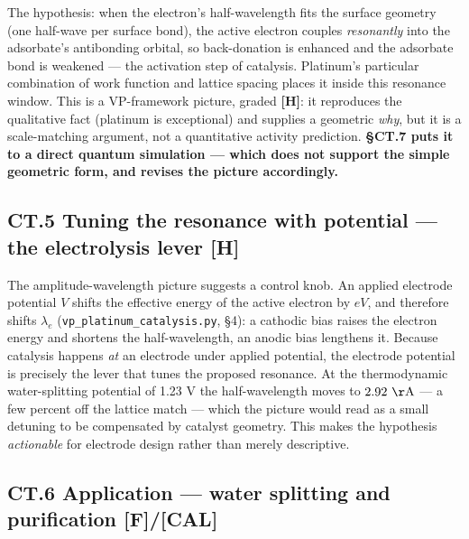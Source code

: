 \documentclass[
  10pt,
]{article}
\begin{document}
The hypothesis: when the electron's half-wavelength fits the surface
geometry (one half-wave per surface bond), the active electron couples
\emph{resonantly} into the adsorbate's antibonding orbital, so
back-donation is enhanced and the adsorbate bond is weakened --- the
activation step of catalysis. Platinum's particular combination of work
function and lattice spacing places it inside this resonance window.
This is a VP-framework picture, graded \textbf{{[}H{]}}: it reproduces
the qualitative fact (platinum is exceptional) and supplies a geometric
\emph{why}, but it is a scale-matching argument, not a quantitative
activity prediction. \textbf{§CT.7 puts it to a direct quantum
simulation --- which does not support the simple geometric form, and
revises the picture accordingly.}

\hypertarget{ct.5-tuning-the-resonance-with-potential-the-electrolysis-lever-h}{%
\subsection{\texorpdfstring{CT.5 Tuning the resonance with potential ---
the electrolysis lever
\textbf{{[}H{]}}}{CT.5 Tuning the resonance with potential --- the electrolysis lever {[}H{]}}}\label{ct.5-tuning-the-resonance-with-potential-the-electrolysis-lever-h}}

The amplitude-wavelength picture suggests a control knob. An applied
electrode potential \(V\) shifts the effective energy of the active
electron by \(eV\), and therefore shifts \(\lambda_e\)
(\texttt{vp\_platinum\_catalysis.py}, §4): a cathodic bias raises the
electron energy and shortens the half-wavelength, an anodic bias
lengthens it. Because catalysis happens \emph{at} an electrode under
applied potential, the electrode potential is precisely the lever that
tunes the proposed resonance. At the thermodynamic water-splitting
potential of 1.23 V the half-wavelength moves to \(2.92\
\mathrm{\AA}\) --- a few percent off the lattice match --- which the
picture would read as a small detuning to be compensated by catalyst
geometry. This makes the hypothesis \emph{actionable} for electrode
design rather than merely descriptive.

\hypertarget{ct.6-application-water-splitting-and-purification-fcal}{%
\subsection{\texorpdfstring{CT.6 Application --- water splitting and
purification
\textbf{{[}F{]}/{[}CAL{]}}}{CT.6 Application --- water splitting and purification {[}F{]}/{[}CAL{]}}}\label{ct.6-application-water-splitting-and-purification-fcal}}
\end{document}
